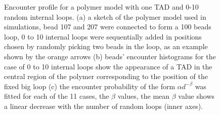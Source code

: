 \documentclass[12pt]{article}
\begin{document}
\begin{figure}[H]
\caption{Encounter profile for a polymer model with one TAD and 0-10 random internal loops. (a) a sketch of the polymer model used in simulations, bead 107 and 207 were connected to form a 100 beads loop, 0 to 10 internal loops were sequentially added in positions chosen by randomly picking two beads in the loop, as an example shown by the orange arrows (b) beads' encounter histograms for the case of 0 to 10 internal loops show the appearance of a TAD in the central region of the polymer corresponding to the position of the fixed big loop (c) the encounter probability of the form $\alpha d^{-\beta}$ was fitted for each of the 11 cases, the $\beta$ values, the mean $\beta$ value shows a linear decrease with the number of random loops (inner axes).}
\label{figure_encounterProfileOneTADWithTails}
\end{figure}
\end{document}
